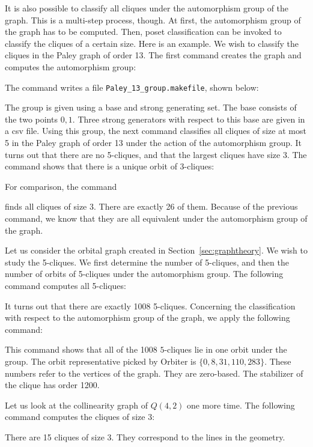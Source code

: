 \bigskip

It is also possible to classify all cliques under the automorphism group of the graph. 
This is a multi-step process, though. At first, the automorphism group of the graph has to be computed. 
Then, poset classification can be invoked to classify the cliques of a certain size. 
Here is an example.
We wish to classify the cliques in the Paley graph of order 13. 
The first command creates the graph and computes the automorphism group:
{\tt

}
The command writes a file \verb'Paley_13_group.makefile', shown below: 
{\tt

}
The group is given using a base and strong generating set. 
The base 
consists of the two points $0,1.$ 
Three strong generators with respect to this base are given in a csv file.
Using this group, 
the next command classifies all cliques of size at most 5 in the Paley graph of order 13 
under the action of the automorphism group. 
It turns out that there are no 5-cliques, and that the largest cliques have size 3. 
The command shows that there is a unique orbit of 3-cliques:
{\tt

}
For comparison, the command 
{\tt

}
finds all cliques of size 3. There are exactly 26 of them. 
Because of the previous command, we know that they are all equivalent under 
the automorphism group of the graph.


\bigskip

Let us consider the orbital graph created in Section~\ref{sec:graphtheory}.
We wish to study the 5-cliques. 
We first determine the number of 5-cliques, 
and then the number of orbits of 5-cliques under the automorphism group. 
The following command computes all 5-cliques:
{\tt

}
It turns out that there are exactly 1008 5-cliques.
Concerning the classification with respect to the automorphism group of the graph, 
we apply the following command:
{\tt

}
This command shows that all of the 1008 $5$-cliques lie in one orbit under the group. 
The orbit representative picked by Orbiter is $\{0,8,31,110,283\}.$ 
These numbers refer to the vertices of the graph. They are zero-based.
The stabilizer of the clique has order 1200.


\bigskip


Let us look at the collinearity graph of $Q(4,2)$ one more time. The following command computes the 
cliques of size 3:
{\tt

}
There are 15 cliques of size 3. They correspond to the lines in the geometry.

